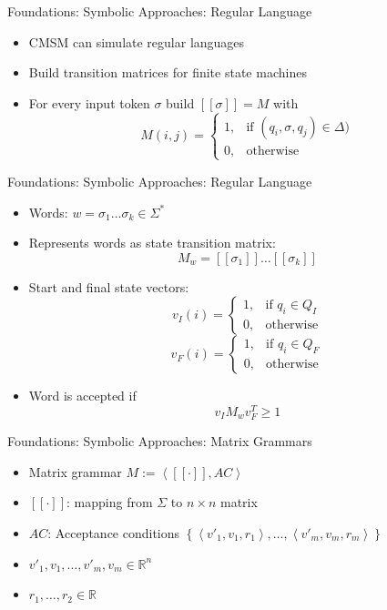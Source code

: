 \documentclass[12pt,a4paper]{beamer}
\newcommand{\tuple}[1]{\ensuremath{\left \langle #1 \right \rangle }}
\newcommand{\setof}[1]{\ensuremath{\left \{ #1 \right \}}}
\begin{document}
\begin{frame}{Foundations: Symbolic Approaches: Regular Language}
\begin{itemize}
\item CMSM can simulate regular languages
\item Build transition matrices for finite state machines
\item For every input token $\sigma$ build $[[\sigma]] = M$ with
$$ M(i,j) = \left\{\begin{array}{cl} 1, & \mbox{if } (q_{i},\sigma,q_{j}) \in \Delta) \\ 0, & \mbox{otherwise} \end{array}\right.  $$
\end{itemize}
\end{frame}


\begin{frame}{Foundations: Symbolic Approaches: Regular Language}
\begin{itemize}
\item Words: $w = \sigma_{1} \ldots \sigma_{k} \in \Sigma^{*}$ 
\item Represents words as state transition matrix:
$$ M_{w} = [[\sigma_{1}]]\ldots [[\sigma_{k}]]  $$
\item Start and final state vectors:
$$ v_{I}(i) = \left\{\begin{array}{cl} 1, & \mbox{if } q_{i} \in Q_{I} \\ 0, & \mbox{otherwise} \end{array}\right. $$ 
$$ v_{F}(i) = \left\{\begin{array}{cl} 1, & \mbox{if } q_{i} \in Q_{F} \\ 0, & \mbox{otherwise} \end{array}\right. $$
\item Word is accepted if
$$ v_{I}M_{w}v_{F}^{T} \ge 1 $$
\end{itemize}
\end{frame}



\begin{frame}{Foundations: Symbolic Approaches: Matrix Grammars}
\begin{itemize}
\item Matrix grammar $M := \tuple{[[\mathord{\cdot}]], AC}$
\item $[[\mathord{\cdot}]]$: mapping from $\Sigma$ to $n \times n $ matrix
\item $AC$: Acceptance conditions $ \setof{ \tuple{v'_{1}, v_{1}, r_{1}}, \ldots, \tuple{v'_{m}, v_{m}, r_{m}} }$
\item $v'_{1}, v_{1},\ldots,v'_{m}, v_{m} \in \mathbb{R}^{n}$
\item $r_{1}, \ldots, r_{2} \in \mathbb{R}$
\end{itemize}
\end{frame}
\end{document}
